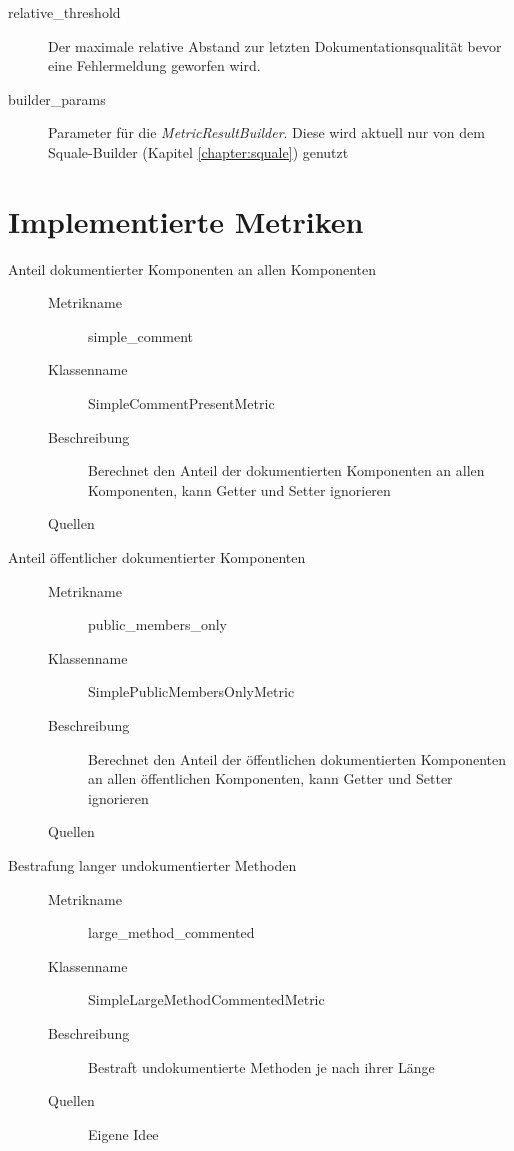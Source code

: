 \begin{appendices}
\begin{description}
         \item[relative\_threshold] Der maximale  relative Abstand zur letzten Dokumentationsqualität bevor eine Fehlermeldung geworfen wird.
         \item[builder\_params] Parameter für die \textit{MetricResultBuilder}. Diese wird aktuell nur von dem Squale-Builder (Kapitel \ref{chapter:squale}) genutzt
        
        
        
    \label{enum:tool_javadoc_conf}
\end{description}
\chapter{Implementierte Metriken}\label{appendix_metrics}

\begin{description}

\item[Anteil dokumentierter Komponenten an allen Komponenten]
\begin{description}
\item[]
    \item [Metrikname]  simple\_comment
    \item [Klassenname] SimpleCommentPresentMetric
    \item[Beschreibung] Berechnet den Anteil der dokumentierten Komponenten an allen Komponenten, kann Getter und Setter ignorieren
    \item[Quellen] \cite[S. 5]{HowDocumentationEvolvesoverTime}
\end{description}

\item[Anteil öffentlicher dokumentierter Komponenten]
\begin{description}
\item[]
    \item [Metrikname]  public\_members\_only
    \item [Klassenname] SimplePublicMembersOnlyMetric
    \item[Beschreibung] Berechnet den Anteil der öffentlichen dokumentierten Komponenten an allen öffentlichen Komponenten, kann Getter und Setter ignorieren
     \item[Quellen] \cite[S. 253]{JavadocViolationsandTheirEvolutioninOpen-SourceSoftware}
\end{description}

\item[Bestrafung langer undokumentierter Methoden]
\begin{description}
\item[]
    \item [Metrikname]  large\_method\_commented
    \item [Klassenname] SimpleLargeMethodCommentedMetric
    \item[Beschreibung] Bestraft undokumentierte Methoden je nach ihrer Länge
    \item[Quellen] Eigene Idee
\end{description}


\end{description}
\end{appendices}
